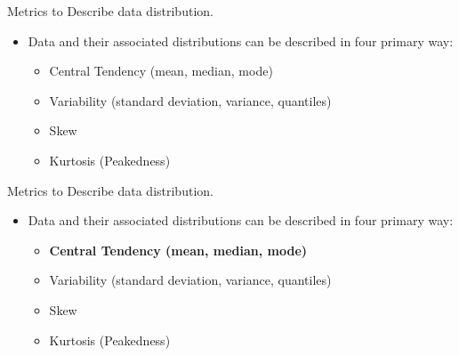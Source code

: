 \documentclass[
  ignorenonframetext,
]{beamer}
\providecommand{\tightlist}{%
  \setlength{\itemsep}{0pt}\setlength{\parskip}{0pt}}
\begin{document}
\begin{frame}{Metrics to Describe data distribution.}
\label{metrics-to-describe-data-distribution.}
\begin{itemize}
\item
  Data and their associated distributions can be described in four
  primary way:

  \begin{itemize}
  \tightlist
  \item
    Central Tendency (mean, median, mode)
  \item
    Variability (standard deviation, variance, quantiles)
  \item
    Skew
  \item
    Kurtosis (Peakedness)
  \end{itemize}
\end{itemize}
\end{frame}

\begin{frame}{Metrics to Describe data distribution.}
\label{metrics-to-describe-data-distribution.-1}
\begin{itemize}
\item
  Data and their associated distributions can be described in four
  primary way:

  \begin{itemize}
  \tightlist
  \item
    \textbf{Central Tendency (mean, median, mode)}
  \item
    Variability (standard deviation, variance, quantiles)
  \item
    Skew
  \item
    Kurtosis (Peakedness)
  \end{itemize}
\end{itemize}
\end{frame}
\end{document}
